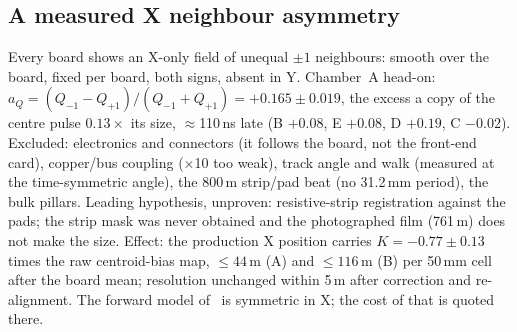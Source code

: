 \subsection{A measured X neighbour asymmetry}\label{sec:xasym}
Every board shows an X-only field of unequal $\pm1$ neighbours: smooth over the board, fixed per
board, both signs, absent in Y. Chamber~A head-on: $a_Q=(Q_{-1}-Q_{+1})/(Q_{-1}+Q_{+1})=+0.165\pm0.019$, the excess a copy of
the centre pulse $0.13\times$ its size, $\approx$110\,ns late (B $+0.08$, E $+0.08$, D $+0.19$, C $-0.02$).
Excluded: electronics and connectors (it follows the board, not the front-end card), copper/bus coupling ($\times$10 too weak),
track angle and walk (measured at the time-symmetric angle), the 800\,\textmu m strip/pad beat (no 31.2\,mm period),
the bulk pillars. Leading hypothesis, unproven: resistive-strip registration against the pads; the strip mask was
never obtained and the photographed film (761\,\textmu m) does not make the size. Effect: the production X position
carries $K=-0.77\pm0.13$ times the raw centroid-bias map, $\le44$\,\textmu m (A) and $\le116$\,\textmu m (B) per
50\,mm cell after the board mean; resolution unchanged within 5\,\textmu m after correction and re-alignment. The
forward model of~\cite{paperII} is symmetric in X; the cost of that is quoted there.

